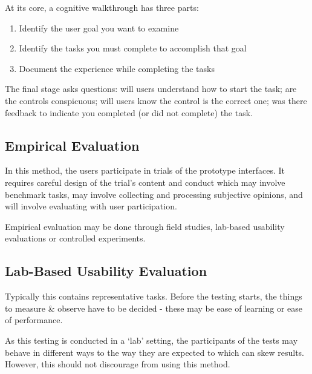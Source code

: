 At its core, a cognitive walkthrough has three parts:
\begin{enumerate}
    \item Identify the user goal you want to examine
    \item Identify the tasks you must complete to accomplish that goal
    \item Document the experience while completing the tasks
\end{enumerate}
The final stage asks questions: will users understand how to start the task; are the controls conspicuous; will users know the control is the correct one; was there feedback to indicate you completed (or did not complete) the task.

\subsection{Empirical Evaluation}
In this method, the users participate in trials of the prototype interfaces. It requires careful design of the trial's content and conduct which may involve benchmark tasks, may involve collecting and processing subjective opinions, and will involve evaluating with user participation.

Empirical evaluation may be done through field studies, lab-based usability evaluations or controlled experiments.

\subsection{Lab-Based Usability Evaluation}
Typically this contains representative tasks. Before the testing starts, the things to measure \& observe have to be decided - these may be ease of learning or ease of performance.

As this testing is conducted in a `lab' setting, the participants of the tests may behave in different ways to the way they are expected to which can skew results. However, this should not discourage from using this method.